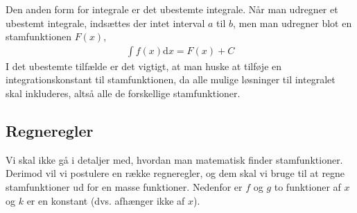 \noindent
Den anden form for integrale er det ubestemte integrale. Når man udregner et ubestemt
integrale, indsættes der intet interval $a$ til $b$, men man udregner blot en stamfunktionen $F(x)$,
\begin{align*}
\int f(x) \text{d}x = F(x) + C
\end{align*}
I det ubestemte tilfælde er det vigtigt, at man huske at tilføje en integrationskonstant til
stamfunktionen, da alle mulige løsninger til integralet skal inkluderes, altså alle de forskellige stamfunktioner.

\subsection{Regneregler}
Vi skal ikke gå i detaljer med, hvordan man matematisk finder
stamfunktioner. Derimod vil vi postulere en række regneregler,
og dem skal vi bruge til at regne stamfunktioner ud for en
masse funktioner. Nedenfor er $f$ og $g$ to funktioner af $x$ og $k$ er en
konstant (dvs. afhænger ikke af $x$).
